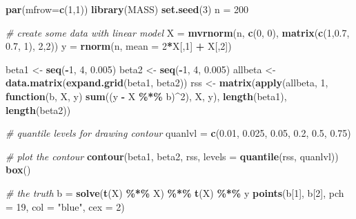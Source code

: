 \documentclass[
]{book}
\newenvironment{Shaded}{\begin{snugshade}}{\end{snugshade}}
\newcommand{\AttributeTok}[1]{\textcolor[rgb]{0.13,0.29,0.53}{#1}}
\newcommand{\CommentTok}[1]{\textcolor[rgb]{0.56,0.35,0.01}{\textit{#1}}}
\newcommand{\ControlFlowTok}[1]{\textcolor[rgb]{0.13,0.29,0.53}{\textbf{#1}}}
\newcommand{\DecValTok}[1]{\textcolor[rgb]{0.00,0.00,0.81}{#1}}
\newcommand{\FloatTok}[1]{\textcolor[rgb]{0.00,0.00,0.81}{#1}}
\newcommand{\FunctionTok}[1]{\textcolor[rgb]{0.13,0.29,0.53}{\textbf{#1}}}
\newcommand{\NormalTok}[1]{#1}
\newcommand{\OtherTok}[1]{\textcolor[rgb]{0.56,0.35,0.01}{#1}}
\newcommand{\SpecialCharTok}[1]{\textcolor[rgb]{0.81,0.36,0.00}{\textbf{#1}}}
\newcommand{\StringTok}[1]{\textcolor[rgb]{0.31,0.60,0.02}{#1}}
\theoremstyle{definition}
\theoremstyle{definition}
\theoremstyle{definition}
\theoremstyle{definition}
\theoremstyle{remark}
\begin{document}
\begin{Shaded}
\begin{Highlighting}[]
  \FunctionTok{par}\NormalTok{(}\AttributeTok{mfrow=}\FunctionTok{c}\NormalTok{(}\DecValTok{1}\NormalTok{,}\DecValTok{1}\NormalTok{))}
  \FunctionTok{library}\NormalTok{(MASS)}
  \FunctionTok{set.seed}\NormalTok{(}\DecValTok{3}\NormalTok{)}
\NormalTok{  n }\OtherTok{=} \DecValTok{200}
  
  \CommentTok{\# create some data with linear model}
\NormalTok{  X }\OtherTok{=} \FunctionTok{mvrnorm}\NormalTok{(n, }\FunctionTok{c}\NormalTok{(}\DecValTok{0}\NormalTok{, }\DecValTok{0}\NormalTok{), }\FunctionTok{matrix}\NormalTok{(}\FunctionTok{c}\NormalTok{(}\DecValTok{1}\NormalTok{,}\FloatTok{0.7}\NormalTok{, }\FloatTok{0.7}\NormalTok{, }\DecValTok{1}\NormalTok{), }\DecValTok{2}\NormalTok{,}\DecValTok{2}\NormalTok{))}
\NormalTok{  y }\OtherTok{=} \FunctionTok{rnorm}\NormalTok{(n, }\AttributeTok{mean =} \DecValTok{2}\SpecialCharTok{*}\NormalTok{X[,}\DecValTok{1}\NormalTok{] }\SpecialCharTok{+}\NormalTok{ X[,}\DecValTok{2}\NormalTok{])}
  
\NormalTok{  beta1 }\OtherTok{\textless{}{-}} \FunctionTok{seq}\NormalTok{(}\SpecialCharTok{{-}}\DecValTok{1}\NormalTok{, }\DecValTok{4}\NormalTok{, }\FloatTok{0.005}\NormalTok{)}
\NormalTok{  beta2 }\OtherTok{\textless{}{-}} \FunctionTok{seq}\NormalTok{(}\SpecialCharTok{{-}}\DecValTok{1}\NormalTok{, }\DecValTok{4}\NormalTok{, }\FloatTok{0.005}\NormalTok{)}
\NormalTok{  allbeta }\OtherTok{\textless{}{-}} \FunctionTok{data.matrix}\NormalTok{(}\FunctionTok{expand.grid}\NormalTok{(beta1, beta2))}
\NormalTok{  rss }\OtherTok{\textless{}{-}} \FunctionTok{matrix}\NormalTok{(}\FunctionTok{apply}\NormalTok{(allbeta, }\DecValTok{1}\NormalTok{, }\ControlFlowTok{function}\NormalTok{(b, X, y) }\FunctionTok{sum}\NormalTok{((y }\SpecialCharTok{{-}}\NormalTok{ X }\SpecialCharTok{\%*\%}\NormalTok{ b)}\SpecialCharTok{\^{}}\DecValTok{2}\NormalTok{), X, y), }
                \FunctionTok{length}\NormalTok{(beta1), }\FunctionTok{length}\NormalTok{(beta2))}
  
  \CommentTok{\# quantile levels for drawing contour}
\NormalTok{  quanlvl }\OtherTok{=} \FunctionTok{c}\NormalTok{(}\FloatTok{0.01}\NormalTok{, }\FloatTok{0.025}\NormalTok{, }\FloatTok{0.05}\NormalTok{, }\FloatTok{0.2}\NormalTok{, }\FloatTok{0.5}\NormalTok{, }\FloatTok{0.75}\NormalTok{)}
  
  \CommentTok{\# plot the contour}
  \FunctionTok{contour}\NormalTok{(beta1, beta2, rss, }\AttributeTok{levels =} \FunctionTok{quantile}\NormalTok{(rss, quanlvl))}
  \FunctionTok{box}\NormalTok{()}
  
  \CommentTok{\# the truth}
\NormalTok{  b }\OtherTok{=} \FunctionTok{solve}\NormalTok{(}\FunctionTok{t}\NormalTok{(X) }\SpecialCharTok{\%*\%}\NormalTok{ X) }\SpecialCharTok{\%*\%} \FunctionTok{t}\NormalTok{(X) }\SpecialCharTok{\%*\%}\NormalTok{ y}
  \FunctionTok{points}\NormalTok{(b[}\DecValTok{1}\NormalTok{], b[}\DecValTok{2}\NormalTok{], }\AttributeTok{pch =} \DecValTok{19}\NormalTok{, }\AttributeTok{col =} \StringTok{"blue"}\NormalTok{, }\AttributeTok{cex =} \DecValTok{2}\NormalTok{)}
\end{Highlighting}
\end{Shaded}
\end{document}
